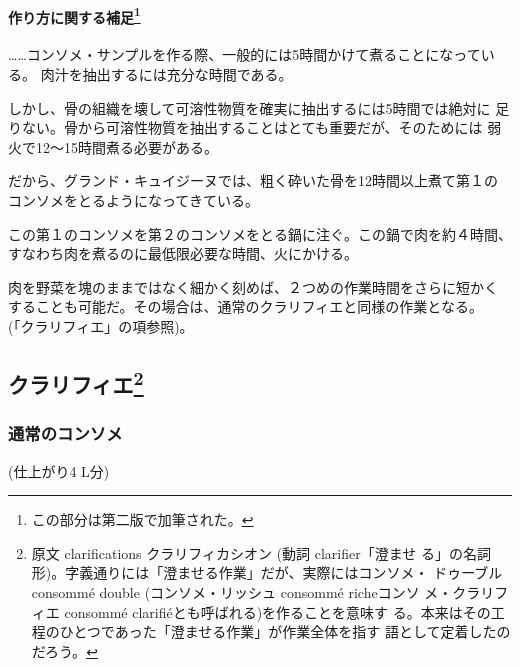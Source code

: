 \begin{recette}
{\paragraph[作り方に関する補足]{\texorpdfstring{作り方に関する補足\footnote{この部分は第二版で加筆された。}}{作り方に関する補足}}\label{ux4f5cux308aux65b9ux306bux95a2ux3059ux308bux88dcux8db33}}

\ldots{}\ldots{}コンソメ・サンプルを作る際、一般的には5時間かけて煮ることになっている。
肉汁を抽出するには充分な時間である。

しかし、骨の組織を壊して可溶性物質を確実に抽出するには5時間では絶対に
足りない。骨から可溶性物質を抽出することはとても重要だが、そのためには
弱火で12〜15時間煮る必要がある。

だから、グランド・キュイジーヌでは、粗く砕いた骨を12時間以上煮て第１の
コンソメをとるようになってきている。

この第１のコンソメを第２のコンソメをとる鍋に注ぐ。この鍋で肉を約４時間、
すなわち肉を煮るのに最低限必要な時間、火にかける。

肉を野菜を塊のままではなく細かく刻めば、２つめの作業時間をさらに短かく
することも可能だ。その場合は、通常のクラリフィエと同様の作業となる。
(「クラリフィエ」の項参照)。
\end{recette}
\hypertarget{ux30afux30e9ux30eaux30d5ux30a3ux30a84}{%
\subsection[クラリフィエ]{\texorpdfstring{クラリフィエ\footnote{原文
  clarifications クラリフィカシオン (動詞 clarifier「澄ませ
  る」の名詞形)。字義通りには「澄ませる作業」だが、実際にはコンソメ・
  ドゥーブルconsommé double (コンソメ・リッシュ consommé richeコンソ
  メ・クラリフィエ consommé clarifiéとも呼ばれる)を作ることを意味す
  る。本来はその工程のひとつであった「澄ませる作業」が作業全体を指す
  語として定着したのだろう。}}{クラリフィエ}}\label{ux30afux30e9ux30eaux30d5ux30a3ux30a84}}


\hypertarget{ux901aux5e38ux306eux30b3ux30f3ux30bdux30e1}{%
\subsubsection{通常のコンソメ}\label{ux901aux5e38ux306eux30b3ux30f3ux30bdux30e1}}

(仕上がり4 L分)

